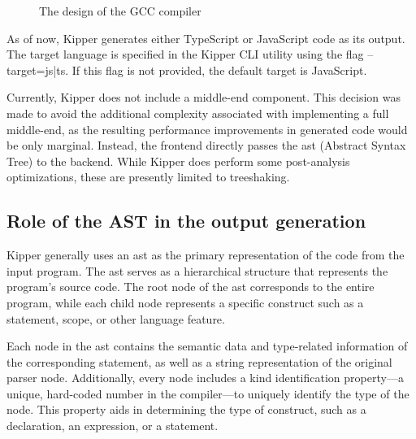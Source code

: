 \begin{figure}[h!]
	\centering
	\def\stackalignment{r}
	\caption{The design of the GCC compiler}
	\label{fig:implementation:gcccompiler}
\end{figure}

As of now, Kipper generates either TypeScript or JavaScript code as its output. The target language is specified in the Kipper CLI utility using the flag --target={js|ts}. If this flag is not provided, the default target is JavaScript.

Currently, Kipper does not include a middle-end component. This decision was made to avoid the additional complexity associated with implementing a full middle-end, as the resulting performance improvements in generated code would be only marginal. Instead, the frontend directly passes the \acrshort{ast} (Abstract Syntax Tree) to the backend. While Kipper does perform some post-analysis optimizations, these are presently limited to treeshaking.

\subsection{Role of the AST in the output generation}

Kipper generally uses an \acrshort{ast} as the primary representation of the code from the input program. The \acrshort{ast} serves as a hierarchical structure that represents the program's source code. The root node of the \acrshort{ast} corresponds to the entire program, while each child node represents a specific construct such as a statement, scope, or other language feature.

Each node in the \acrshort{ast} contains the semantic data and type-related information of the corresponding statement, as well as a string representation of the original parser node. Additionally, every node includes a kind identification property—a unique, hard-coded number in the compiler—to uniquely identify the type of the node. This property aids in determining the type of construct, such as a declaration, an expression, or a statement.

